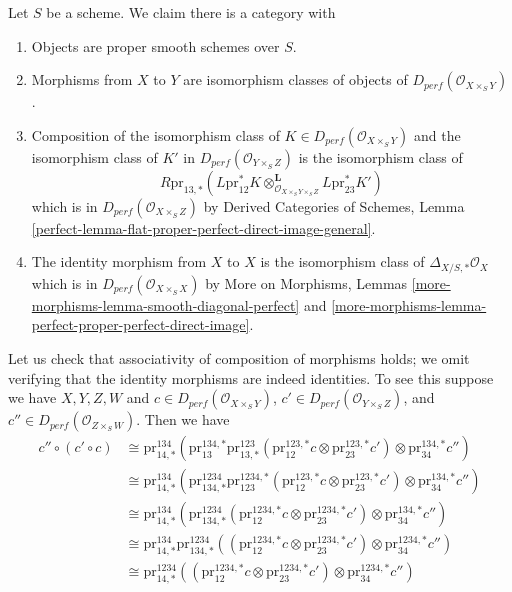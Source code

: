 \noindent
Let $S$ be a scheme. We claim there is a category
with
\begin{enumerate}
\item Objects are proper smooth schemes over $S$.
\item Morphisms from $X$ to $Y$ are isomorphism classes
of objects of $D_{perf}(\mathcal{O}_{X \times_S Y})$.
\item Composition of the isomorphism class of
$K \in D_{perf}(\mathcal{O}_{X \times_S Y})$
and the isomorphism class of $K'$ in $D_{perf}(\mathcal{O}_{Y \times_S Z})$
is the isomorphism class of
$$
R\text{pr}_{13, *}(
L\text{pr}_{12}^*K
\otimes_{\mathcal{O}_{X \times_S Y \times_S Z}}^\mathbf{L}
L\text{pr}_{23}^*K')
$$
which is in $D_{perf}(\mathcal{O}_{X \times_S Z})$ by
Derived Categories of Schemes, Lemma
\ref{perfect-lemma-flat-proper-perfect-direct-image-general}.
\item The identity morphism from $X$ to $X$ is the
isomorphism class of $\Delta_{X/S, *}\mathcal{O}_X$
which is in $D_{perf}(\mathcal{O}_{X \times_S X})$
by More on Morphisms, Lemmas
\ref{more-morphisms-lemma-smooth-diagonal-perfect} and
\ref{more-morphisms-lemma-perfect-proper-perfect-direct-image}.
\end{enumerate}
Let us check that associativity of composition
of morphisms holds; we omit verifying that the identity
morphisms are indeed identities. To see this suppose we have
$X, Y, Z, W$ and
$c \in D_{perf}(\mathcal{O}_{X \times_S Y})$,
$c' \in D_{perf}(\mathcal{O}_{Y \times_S Z})$, and
$c'' \in D_{perf}(\mathcal{O}_{Z \times_S W})$. Then we have
\begin{align*}
c'' \circ (c' \circ c)
& \cong
\text{pr}^{134}_{14, *}(
\text{pr}^{134, *}_{13}
\text{pr}^{123}_{13, *}(\text{pr}^{123, *}_{12}c \otimes
\text{pr}^{123, *}_{23}c')
\otimes \text{pr}^{134, *}_{34}c'') \\
& \cong
\text{pr}^{134}_{14, *}(
\text{pr}^{1234}_{134, *}
\text{pr}^{1234, *}_{123}(\text{pr}^{123, *}_{12}c \otimes
\text{pr}^{123, *}_{23}c')
\otimes \text{pr}^{134, *}_{34}c'') \\
& \cong
\text{pr}^{134}_{14, *}(
\text{pr}^{1234}_{134, *}
(\text{pr}^{1234, *}_{12}c \otimes
\text{pr}^{1234, *}_{23}c')
\otimes \text{pr}^{134, *}_{34}c'') \\
& \cong
\text{pr}^{134}_{14, *}
\text{pr}^{1234}_{134, *}
((\text{pr}^{1234, *}_{12}c \otimes
\text{pr}^{1234, *}_{23}c')
\otimes \text{pr}^{1234, *}_{34}c'') \\
& \cong
\text{pr}^{1234}_{14, *}(
(\text{pr}^{1234, *}_{12}c \otimes
\text{pr}^{1234, *}_{23}c') \otimes
\text{pr}^{1234, *}_{34}c'')
\end{align*}
